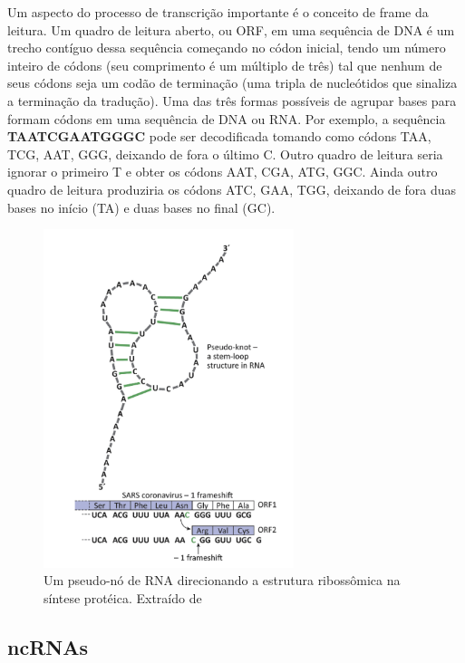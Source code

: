 Um aspecto do processo de transcrição importante é o conceito de frame da leitura. Um quadro de leitura aberto, ou ORF, em uma sequência de DNA é um trecho contíguo dessa sequência começando no códon inicial, tendo um número inteiro de códons (seu comprimento é um múltiplo de três) tal que nenhum de seus códons seja um codão de terminação (uma tripla de nucleótidos que sinaliza a terminação da tradução). Uma das três formas possíveis de agrupar bases para formam códons em uma sequência de DNA ou RNA. Por exemplo, a sequência \textbf{TAATCGAATGGGC} pode ser decodificada tomando como códons TAA, TCG, AAT, GGG, deixando de fora o último C. Outro quadro de leitura seria ignorar o primeiro T e obter os códons AAT, CGA, ATG, GGC. Ainda outro quadro de leitura produziria os códons ATC, GAA, TGG, deixando de fora duas bases no início (TA) e duas bases no final (GC).\cite{stop-codon}

\begin{figure}[h]
    \centering
    \includegraphics[width=0.65\textwidth]{images/covid_synthesis_proteic.png}
    \caption{Um pseudo-nó de RNA direcionando a estrutura ribossômica na síntese protéica. Extraído de \cite{stop-codon}}
    \label{fig:aminoacidos}
\end{figure}

\subsection{ncRNAs}

